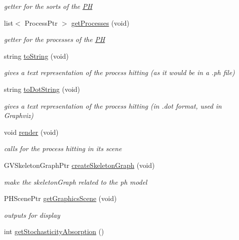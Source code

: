 \begin{DoxyCompactItemize}
\begin{DoxyCompactList}\small\item\em getter for the sorts of the \hyperlink{classPH}{P\+H} \end{DoxyCompactList}\item 
\hypertarget{classPH_a3c8c9ef16c7c10ad3ca83c633b2e6255}{list$<$ Process\+Ptr $>$ \hyperlink{classPH_a3c8c9ef16c7c10ad3ca83c633b2e6255}{get\+Processes} (void)}\label{classPH_a3c8c9ef16c7c10ad3ca83c633b2e6255}

\begin{DoxyCompactList}\small\item\em getter for the processes of the \hyperlink{classPH}{P\+H} \end{DoxyCompactList}\item 
string \hyperlink{classPH_ae870206aad796943dffaa6bab1f7f293}{to\+String} (void)
\begin{DoxyCompactList}\small\item\em gives a text representation of the process hitting (as it would be in a .ph file) \end{DoxyCompactList}\item 
string \hyperlink{classPH_aa0a7716cb565380f06670517609ee960}{to\+Dot\+String} (void)
\begin{DoxyCompactList}\small\item\em gives a text representation of the process hitting (in .dot format, used in Graphviz) \end{DoxyCompactList}\item 
void \hyperlink{classPH_af1f67304076aded44a15a30aed6dc652}{render} (void)
\begin{DoxyCompactList}\small\item\em calls for the process hitting in its scene \end{DoxyCompactList}\item 
G\+V\+Skeleton\+Graph\+Ptr \hyperlink{classPH_aedd3200ed6657a0a793f5ffb60dac9a5}{create\+Skeleton\+Graph} (void)
\begin{DoxyCompactList}\small\item\em make the skeleton\+Graph related to the ph model \end{DoxyCompactList}\item 
P\+H\+Scene\+Ptr \hyperlink{classPH_aaf75a785bb9bd06cec611f0fb69d05f6}{get\+Graphics\+Scene} (void)
\begin{DoxyCompactList}\small\item\em outputs for display \end{DoxyCompactList}\item 
\hypertarget{classPH_a0494ca8a53e983230a9df06fa71043e1}{int \hyperlink{classPH_a0494ca8a53e983230a9df06fa71043e1}{get\+Stochasticity\+Absorption} ()}\label{classPH_a0494ca8a53e983230a9df06fa71043e1}


\end{DoxyCompactItemize}

